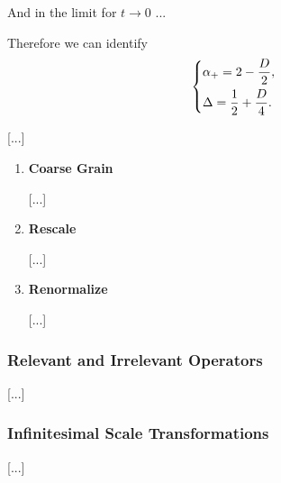 And in the limit for \(t \to 0\) ...

Therefore we can identify
\[
    \begin{dcases}
        \alpha_+ = 2 - \frac{D}{2}, \\
        \Delta = \frac{1}{2} + \frac{D}{4}.
    \end{dcases}
\]

[...]

\begin{enumerate}
    \item \textbf{Coarse Grain}

          [...]

    \item \textbf{Rescale}

          [...]

    \item \textbf{Renormalize}

          [...]
\end{enumerate}

\subsubsection{Relevant and Irrelevant Operators}

[...]

\begin{remark}

\end{remark}

\subsubsection{Infinitesimal Scale Transformations}

[...]